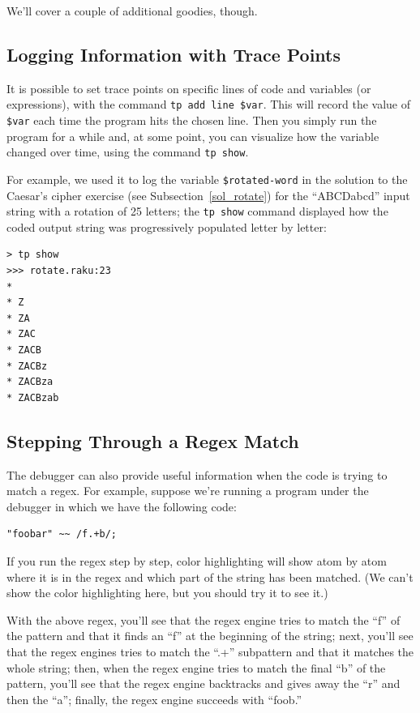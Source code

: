 We'll cover a couple of additional goodies, though. 

\subsection{Logging Information with Trace Points}

It is possible to set trace points on specific lines of code 
and variables (or expressions), with the command {\tt tp add 
line \$var}. This will record the value of \verb'$var' each 
time the program hits the chosen line. Then you simply run 
the program for a while and, at some point, you can visualize 
how the variable changed over time, using the command 
{\tt tp show}.

For example, we used it to log the variable \verb'$rotated-word' 
in the solution to the Caesar's cipher exercise 
(see Subsection~\ref{sol_rotate}) for the 
``ABCDabcd'' input string with a rotation of 25 letters; 
the {\tt tp show} command displayed how the coded output 
string was progressively populated letter by letter:

\begin{verbatim}
> tp show
>>> rotate.raku:23
*
* Z
* ZA
* ZAC
* ZACB
* ZACBz
* ZACBza
* ZACBzab
\end{verbatim}

\subsection{Stepping Through a Regex Match}
\label{regex-debugging}

The debugger can also provide useful information when the 
code is trying to match a regex. For example, suppose we're 
running a program under the debugger in which we have the 
following code:

\begin{verbatim}
"foobar" ~~ /f.+b/;
\end{verbatim}

If you run the regex step by step, color highlighting will show 
atom by atom where it is in the regex and which part of the 
string has been matched. (We can't show the color highlighting 
here, but you should try it to see it.)

With the above regex, you'll see that 
the regex engine tries to match the ``f'' of the pattern and that 
it finds an ``f'' at the beginning of the string; next, you'll see 
that the regex engines tries to match the ``.+'' subpattern and 
that it matches the whole string; then, when the regex engine 
tries to match the final ``b'' of the pattern, you'll see that 
the regex engine backtracks and gives away the ``r'' and then the 
``a''; finally, the regex engine succeeds with ``foob.''

